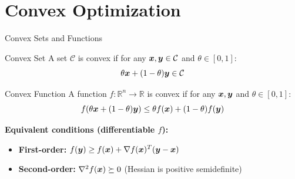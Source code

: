 \documentclass[aspectratio=169]{beamer}
\begin{document}
\section{Convex Optimization}

\begin{frame}{Convex Sets and Functions}
  \begin{definitionbox}{Convex Set}
    A set $\mathcal{C}$ is convex if for any $\boldsymbol{x}, \boldsymbol{y} \in \mathcal{C}$ and $\theta \in [0,1]$:
    $$\theta \boldsymbol{x} + (1-\theta)\boldsymbol{y} \in \mathcal{C}$$
  \end{definitionbox}

  \vspace{0.5em}

  \begin{definitionbox}{Convex Function}
    A function $f: \mathbb{R}^n \to \mathbb{R}$ is convex if for any $\boldsymbol{x}, \boldsymbol{y}$ and $\theta \in [0,1]$:
    $$f(\theta \boldsymbol{x} + (1-\theta)\boldsymbol{y}) \leq \theta f(\boldsymbol{x}) + (1-\theta) f(\boldsymbol{y})$$
  \end{definitionbox}

  \vspace{0.5em}

  \textbf{Equivalent conditions (differentiable $f$):}
  \begin{itemize}
    \item \textbf{First-order:} $f(\boldsymbol{y}) \geq f(\boldsymbol{x}) + \nabla f(\boldsymbol{x})^T(\boldsymbol{y} - \boldsymbol{x})$
    \item \textbf{Second-order:} $\nabla^2 f(\boldsymbol{x}) \succeq 0$ (Hessian is positive semidefinite)
  \end{itemize}
\end{frame}
\end{document}
